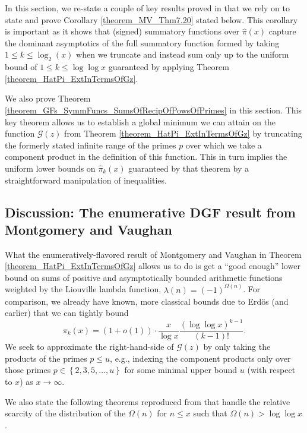 \documentclass[11pt,reqno,a4letter]{article}
\numberwithin{figure}{section}
\numberwithin{table}{section}
\theoremstyle{plain}
\numberwithin{theorem}{section}
\theoremstyle{definition}
\begin{document}
In this section, we re-state a couple of key results proved in \cite[\S 7.4]{MV} that we rely on 
to state and prove Corollary \ref{theorem_MV_Thm7.20} stated below. This corollary is important as it shows 
that (signed) summatory functions over $\widehat{\pi}(x)$ 
capture the dominant asymptotics of the full summatory function formed by taking $1 \leq k \leq \log_2(x)$ when 
we truncate and instead sum only up to the uniform bound of $1 \leq k \leq \log\log x$ guaranteed by applying 
Theorem \ref{theorem_HatPi_ExtInTermsOfGz}. 

We also prove 
Theorem \ref{theorem_GFs_SymmFuncs_SumsOfRecipOfPowsOfPrimes} in this section. 
This key theorem allows us to establish a global minimum we can attain on the function $\mathcal{G}(z)$ from 
Theorem \ref{theorem_HatPi_ExtInTermsOfGz} by truncating the formerly stated infinite 
range of the primes $p$ over which we take a component product in the definition of this function. 
This in turn implies the uniform lower bounds on $\widehat{\pi}_k(x)$ guaranteed by that theorem by 
a straightforward manipulation of inequalities. 

\subsection{Discussion: The enumerative DGF result from 
            Montgomery and Vaughan} 
\label{subSection_MVPrereqResultStmts} 

What the enumeratively-flavored result of Montgomery and Vaughan 
in Theorem \ref{theorem_HatPi_ExtInTermsOfGz} allows us to do is get a 
``good enough'' lower bound on sums of positive and asymptotically bounded arithmetic functions 
weighted by the Liouville lambda function, $\lambda(n) = (-1)^{\Omega(n)}$. 
For comparison, we already have known, more classical bounds due to Erd\"os (and earlier) that 
we can tightly bound \cite{ERDOS-PRIMEK-FUNC,MV} 
\[
\pi_k(x) = (1 + o(1)) \cdot \frac{x}{\log x} \frac{(\log\log x)^{k-1}}{(k-1)!}. 
\] 
We seek to approximate the right-hand-side of $\mathcal{G}(z)$ by only taking the products of the primes 
$p \leq u$, e.g., indexing the component products only over those primes 
$p \in \left\{2,3,5,\ldots,u\right\}$ for some minimal upper bound $u$ (with respect to $x$) 
as $x \rightarrow \infty$. 

We also state the following theorems reproduced from \cite[\S 7.4]{MV} that handle the relative 
scarcity of the distribution of the $\Omega(n)$ for $n \leq x$ such that 
$\Omega(n) > \log\log x$. 
\end{document}

